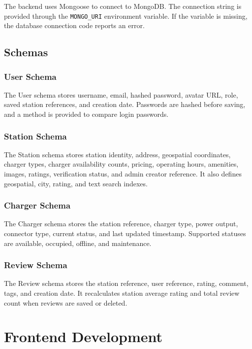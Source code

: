 \documentclass[12pt,a4paper]{article}
\begin{document}
The backend uses Mongoose to connect to MongoDB. The connection string is provided through the \texttt{MONGO\_URI} environment variable. If the variable is missing, the database connection code reports an error.

\subsection{Schemas}

\subsubsection*{User Schema}

The User schema stores username, email, hashed password, avatar URL, role, saved station references, and creation date. Passwords are hashed before saving, and a method is provided to compare login passwords.

\subsubsection*{Station Schema}

The Station schema stores station identity, address, geospatial coordinates, charger types, charger availability counts, pricing, operating hours, amenities, images, ratings, verification status, and admin creator reference. It also defines geospatial, city, rating, and text search indexes.

\subsubsection*{Charger Schema}

The Charger schema stores the station reference, charger type, power output, connector type, current status, and last updated timestamp. Supported statuses are available, occupied, offline, and maintenance.

\subsubsection*{Review Schema}

The Review schema stores the station reference, user reference, rating, comment, tags, and creation date. It recalculates station average rating and total review count when reviews are saved or deleted.

\section{Frontend Development}
\end{document}

